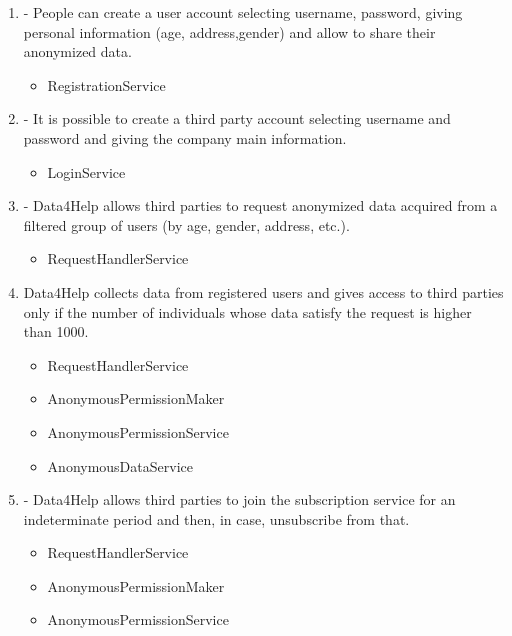 \documentclass[a4paper]{article}
\begin{document}
\begin{enumerate}[label*=\bf{R.\arabic*}]

\item - People can create a user account selecting username, password,
giving personal information (age, address,gender) and allow to
share their anonymized data.

\begin{itemize}
\item RegistrationService
\end{itemize}

\item - It is possible to create a third party account selecting username
and password and giving the company main information.

\begin{itemize}
\item LoginService
\end{itemize}

\item - Data4Help allows third parties to request anonymized data acquired
from a filtered group of users (by age, gender, address, etc.).

\begin{itemize}
\item RequestHandlerService
\end{itemize}

\item Data4Help collects data from registered users and gives access to
third parties only if the number of individuals whose data satisfy the
request is higher than 1000.

\begin{itemize}
\item RequestHandlerService
\item AnonymousPermissionMaker
\item AnonymousPermissionService
\item AnonymousDataService
\end{itemize}

\item - Data4Help allows third parties to join the subscription service for an
indeterminate period and then, in case, unsubscribe from that.

\begin{itemize}
\item RequestHandlerService
\item AnonymousPermissionMaker
\item AnonymousPermissionService
\end{itemize}


\end{enumerate}
\end{document}
